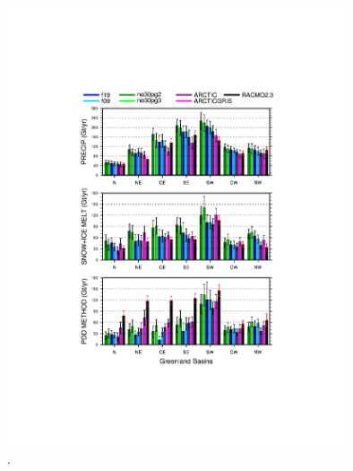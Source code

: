 \documentclass[draft]{agujournal2019}
\begin{document}
\begin{figure}[t]
\begin{center}
         \includegraphics[width=100mm]{figs/temp_tseries_BASIN.pdf}
\end{center}
\caption{.}
\label{fig:basin}
\end{figure}
\end{document}
